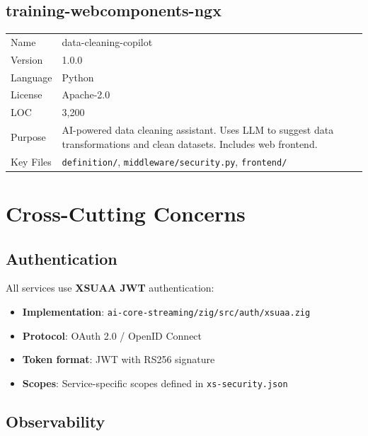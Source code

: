 \documentclass[11pt,a4paper]{article}
\begin{document}
\subsection{training-webcomponents-ngx}

\begin{tabular}{@{}L{4cm}L{10cm}@{}}
\toprule
Name & data-cleaning-copilot \\
Version & 1.0.0 \\
Language & Python \\
License & Apache-2.0 \\
LOC & 3,200 \\
Purpose & AI-powered data cleaning assistant. Uses LLM to suggest data transformations and clean datasets. Includes web frontend. \\
Key Files & \texttt{definition/}, \texttt{middleware/security.py}, \texttt{frontend/} \\
\bottomrule
\end{tabular}

\newpage

\section{Cross-Cutting Concerns}

\subsection{Authentication}

All services use \textbf{XSUAA JWT} authentication:

\begin{itemize}[noitemsep]
    \item \textbf{Implementation}: \texttt{ai-core-streaming/zig/src/auth/xsuaa.zig}
    \item \textbf{Protocol}: OAuth 2.0 / OpenID Connect
    \item \textbf{Token format}: JWT with RS256 signature
    \item \textbf{Scopes}: Service-specific scopes defined in \texttt{xs-security.json}
\end{itemize}

\subsection{Observability}
\end{document}
